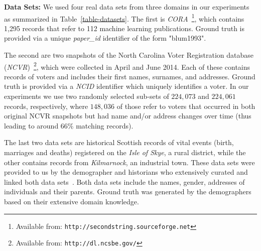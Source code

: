 \documentclass{llncs}
\begin{document}
\smallskip
\textbf{Data Sets:}
We used four real data sets from three domains in our experiments as
summarized in Table~\ref{table-datasets}. The first is
\emph{CORA}~\footnote{Available from:
\texttt{http://secondstring.sourceforge.net}}, which contains 1,295
records that refer to 112 machine learning publications. Ground truth is provided via a unique
\emph{paper\_id} identifier of the form "blum1993".

The second are two snapshots of the North Carolina Voter Registration
database (\emph{NCVR})~\footnote{Available from: \texttt{http://dl.ncsbe.gov/}}, which were collected in April and June
2014. Each of these contains records of voters and includes their
first names, surnames, and addresses. Ground truth is provided via a
\emph{NCID} identifier which uniquely identifies a voter. In our
experiments we use two randomly selected sub-sets of $224,073$ and
$224,061$ records, respectively, where $148,036$ of those refer to
voters that occurred in both original NCVR snapshots but had name
and/or address changes over time (thus leading to around $66\%$
matching records).

The last two data sets are historical Scottish records of vital
events (birth, marriages and deaths) registered on the
\emph{Isle of Skye}, a rural district, while the other contains
records from \emph{Kilmarnock}, an industrial town. These data sets
were provided to us by the demographer and historians who extensively
curated and linked both data sets~\cite{reid2002,reid2006}. Both data
sets include the  names, gender, addresses of individuals and their
parents. Ground truth was generated by the demographers based on their
extensive domain knowledge.

\end{document}
